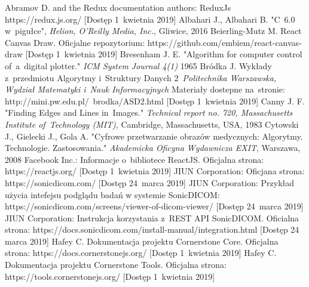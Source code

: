 \documentclass[a4paper,11pt,twoside,openright]{report}
\theoremstyle{definition}
\begin{document}
\begin{thebibliography}{24}%
{}


 Abramov D. and the Redux documentation authors: ReduxJs https://redux.js.org/ [Dostęp 1~kwietnia 2019]
 Albahari J., Albahari B. "C~6.0 w~pigułce", \emph{Helion, O'Reilly Media, Inc.}, Gliwice,  2016
 Beierling-Mutz M. React Canvas Draw. Oficjalne repozytorium: https://github.com/embiem/react-canvas-draw [Dostęp 1~kwietnia 2019]
 Bresenham J. E. "Algorithm for computer control of~a~digital plotter." \emph{ICM System Journal 4(1)} 1965
 Bródka J. Wykłady z~przedmiotu Algorytmy i~Struktury Danych 2~\emph{Politechnika Warszawska, Wydział Matematyki i~Nauk Informacyjnych} Materiały dostepne na~stronie: http://mini.pw.edu.pl/~brodka/ASD2.html [Dostęp 1~kwietnia 2019]
 Canny J. F. "Finding Edges and Lines in~Images." \emph{Technical report no. 720, Massachusetts Institute of~Technology (MIT)}, Cambridge, Massachusetts, USA, 1983
 Cytowski J., Gielecki J., Gola A. "Cyfrowe przetwarzanie obrazów medycznych: Algorytmy. Technologie. Zastosowania." \emph{Akademicka Oficyna Wydawnicza EXIT}, Warszawa, 2008
 Facebook Inc.: Informacje o~bibliotece ReactJS. Oficjalna strona: https://reactjs.org/ [Dostęp 1~kwietnia 2019]
 JIUN Corporation: Oficjana strona: https://sonicdicom.com/ [Dostęp 24~marca 2019]
 JIUN Corporation: Przykład użycia intefejsu podglądu badań w systemie SonicDICOM: https://sonicdicom.com/screens/viewer-of-dicom-viewer/ [Dostęp 24~marca 2019]
 JIUN Corporation: Instrukcja korzystania z~REST API SonicDICOM. Oficialna strona: https://docs.sonicdicom.com/install-manual/integration.html [Dostęp 24 marca 2019]
 Hafey C. Dokumentacja projektu Cornerstone Core. Oficjalna strona: https://docs.cornerstonejs.org/ [Dostęp 1~kwietnia 2019]
 Hafey C. Dokumentacja projektu Cornerstone Tools. Oficjalna strona: https://tools.cornerstonejs.org/ [Dostęp 1~kwietnia 2019]

\end{thebibliography}
\end{document}
